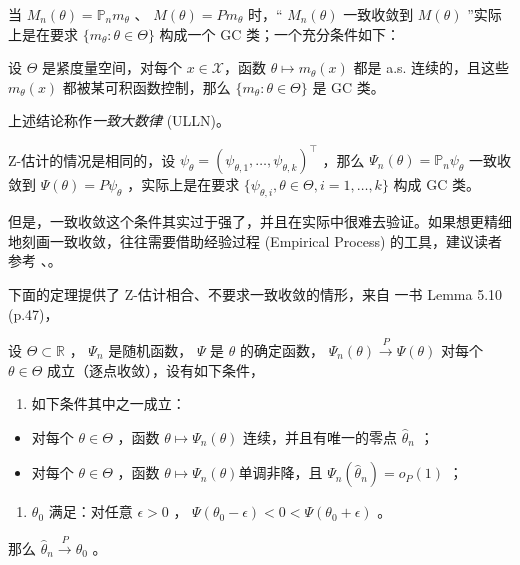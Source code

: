 当 $M_n(\theta)=\mathbb P_n m_\theta$ 、 $M(\theta)=Pm_\theta$ 时，`` $M_n(\theta)$ 一致收敛到 $M(\theta)$ ''实际上是在要求 $\{m_\theta:\theta\in\Theta\}$ 构成一个 GC 类；一个充分条件如下：

\begin{proposition}[一致大数律的一个充分条件]
\label{prop:ch9:gc-sufficient-condition}
设 $\Theta$ 是紧度量空间，对每个 $x\in\mathscr X$，函数 $\theta\mapsto m_\theta(x)$ 都是 a.s. 连续的，且这些 $m_\theta(x)$ 都被某可积函数控制，那么 $\{m_\theta:\theta\in\Theta\}$ 是 GC 类。
\end{proposition}

上述结论称作\emph{一致大数律} (ULLN)。


Z-估计的情况是相同的，设 $\psi_\theta=(\psi_{\theta,1},\dots,\psi_{\theta,k})^\top$ ，那么 $\Psi_n(\theta)=\mathbb P_n\psi_\theta$ 一致收敛到 $\Psi(\theta)=P\psi_\theta$ ，实际上是在要求 $\{\psi_{\theta,i},\theta\in\Theta,i=1,\dots,k\}$ 构成 GC 类。

但是，一致收敛这个条件其实过于强了，并且在实际中很难去验证。如果想更精细地刻画一致收敛，往往需要借助经验过程 (Empirical Process) 的工具，建议读者参考 \cite{vandervaartwellner1996}、\cite{geer2000}。

下面的定理提供了 Z-估计相合、不要求一致收敛的情形，来自 \cite{vandervaart1998} 一书 Lemma 5.10 (p.47)，

\begin{theorem}[单调 Z-估计的相合性]\label{thm:ch9:monotone-z-consistency}

设 $\Theta\subset\mathbb R$ ， $\Psi_n$ 是随机函数， $\Psi$ 是 $\theta$ 的确定函数， $\Psi_n(\theta)\overset P\to\Psi(\theta)$ 对每个 $\theta\in\Theta$ 成立（逐点收敛），设有如下条件，

\begin{enumerate}
\def\labelenumi{\arabic{enumi}.}
\tightlist
\item
  如下条件其中之一成立：
\end{enumerate}

\begin{itemize}
\tightlist
\item
  对每个 $\theta\in\Theta$ ，函数 $\theta\mapsto \Psi_n(\theta)$ 连续，并且有唯一的零点 $\widehat\theta_n$ ；
\item
  对每个 $\theta\in\Theta$ ，函数 $\theta\mapsto \Psi_n(\theta)$单调非降，且 $\Psi_n(\widehat\theta_n)=o_P(1)$ ；
\end{itemize}

\begin{enumerate}
\def\labelenumi{\arabic{enumi}.}
\setcounter{enumi}{1}
\tightlist
\item
  $\theta_0$ 满足：对任意 $\epsilon>0$ ， $\Psi(\theta_0-\epsilon)<0<\Psi(\theta_0+\epsilon)$ 。
\end{enumerate}

那么 $\widehat\theta_n\overset P\to \theta_0$ 。

\end{theorem}

